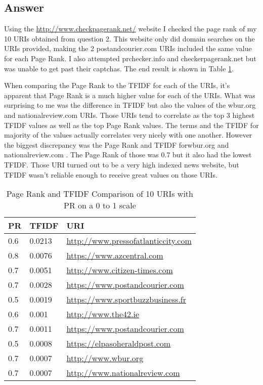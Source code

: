 \documentclass[letterpaper,11pt]{article}
\begin{document}
\clearpage
\subsection*{Answer}

Using the \url{http://www.checkpagerank.net/} website I checked the page rank of my 10 URIs obtained from question 2. This website only did domain searches on the URIs provided, making the 2 postandcourier.com URIs included the same value for each Page Rank.  I also attempted prchecker.info and checkerpagerank.net but was unable to get past their captchas. The end result is shown in Table \ref{table:pgrank}.

When comparing the Page Rank to the TFIDF for each of the URIs, it's apparent that Page Rank is a much higher value for each of the URIs. What was surprising to me was the difference in TFIDF but also the values of the wbur.org and nationalreview.com  URIs. Those  URIs tend to correlate as the top 3 highest TFIDF values as well as the top Page Rank values.  The terms and the TFIDF for majority of the values actually correlates very nicely with one another. However the biggest discrepancy was the Page Rank and TFIDF forwbur.org and nationalreview.com . The Page Rank of those  was 0.7 but it also had the  lowest TFIDF.  Those URI turned out to be a very high indexed news website, but TFIDF wasn't reliable enough to receive great values on those URIs.

\begin{table}
\begin{tabular}{ | l | l | p{8.2cm} | }
\hline
\textbf{PR} & \textbf{TFIDF} & \textbf{URI} \\
\hline
0.6 &  0.0213 & \url{http://www.pressofatlanticcity.com} \\
\hline
0.8  & 0.0076 & \url{https://www.azcentral.com} \\
\hline
0.7 & 0.0051 & \url{http://www.citizen-times.com} \\
\hline
0.7 & 0.0028  & \url{https://www.postandcourier.com} \\
\hline
0.5 & 0.0019 & \url{https://www.sportbuzzbusiness.fr} \\
\hline
0.6 & 0.001  & \url{http://www.the42.ie} \\
\hline
0.7 & 0.0011  & \url{https://www.postandcourier.com} \\
\hline
0.5 & 0.0008  & \url{https://elpasoheraldpost.com} \\
\hline
0.7 & 0.0007 & \url{http://www.wbur.org} \\
\hline
0.7 & 0.0007 & \url{http://www.nationalreview.com} \\
\hline
\end{tabular}
\caption{Page Rank and TFIDF Comparison of 10 URIs with PR on a 0 to 1 scale}
\label{table:pgrank}
\end{table}
\end{document}
